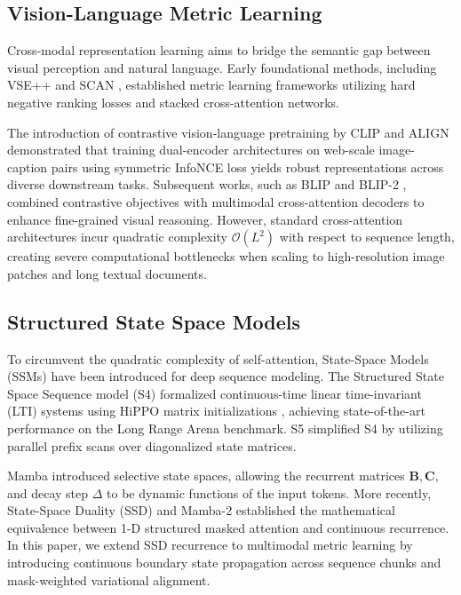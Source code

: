\documentclass[11pt,journal,onecolumn,draftcls]{IEEEtran}
\begin{document}
\subsection{Vision-Language Metric Learning}
Cross-modal representation learning aims to bridge the semantic gap between visual perception and natural language. Early foundational methods, including VSE++ \cite{faghri2017vse++} and SCAN \cite{lee2018stacked}, established metric learning frameworks utilizing hard negative ranking losses and stacked cross-attention networks. 

The introduction of contrastive vision-language pretraining by CLIP \cite{radford2021learning} and ALIGN \cite{jia2021scaling} demonstrated that training dual-encoder architectures on web-scale image-caption pairs using symmetric InfoNCE loss yields robust representations across diverse downstream tasks. Subsequent works, such as BLIP \cite{li2022blip} and BLIP-2 \cite{li2023blip2}, combined contrastive objectives with multimodal cross-attention decoders to enhance fine-grained visual reasoning. However, standard cross-attention architectures incur quadratic complexity $\mathcal{O}(L^2)$ with respect to sequence length, creating severe computational bottlenecks when scaling to high-resolution image patches and long textual documents.

\subsection{Structured State Space Models}
To circumvent the quadratic complexity of self-attention, State-Space Models (SSMs) have been introduced for deep sequence modeling. The Structured State Space Sequence model (S4) \cite{gu2021efficiently} formalized continuous-time linear time-invariant (LTI) systems using HiPPO matrix initializations \cite{gu2020hippo}, achieving state-of-the-art performance on the Long Range Arena benchmark. S5 \cite{smith2022simplified} simplified S4 by utilizing parallel prefix scans over diagonalized state matrices.

Mamba \cite{gu2023mamba} introduced selective state spaces, allowing the recurrent matrices $\mathbf{B}, \mathbf{C},$ and decay step $\Delta$ to be dynamic functions of the input tokens. More recently, State-Space Duality (SSD) and Mamba-2 \cite{dao2024transformers} established the mathematical equivalence between 1-D structured masked attention and continuous recurrence. In this paper, we extend SSD recurrence to multimodal metric learning by introducing continuous boundary state propagation across sequence chunks and mask-weighted variational alignment.
\end{document}
